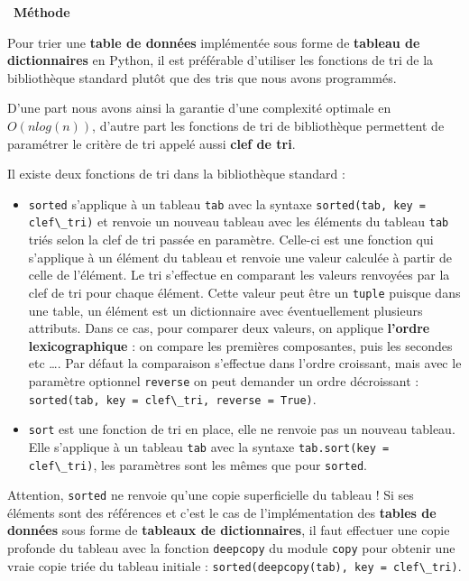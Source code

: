 \documentclass[
  11pt,
]{article}
\newcommand{\passthrough}[1]{#1}
\newcounter{prog}
\newenvironment{methode}[1]
{\par \medskip    \noindent  
 \begin {bclogo}[arrondi =0.1,logo=\bcoutil, marge=4,noborder = true] {~\textbf{Méthode}   {\itshape #1} }  \par}
{
\end{bclogo}
 \par \bigskip }
\begin{document}
\begin{methode}{}

Pour trier une \textbf{table de données} implémentée sous forme de
\textbf{tableau de dictionnaires} en Python, il est préférable
d'utiliser les fonctions de tri de la bibliothèque standard plutôt que
des tris que nous avons programmés.

D'une part nous avons ainsi la garantie d'une complexité optimale en
\(O(nlog(n))\), d'autre part les fonctions de tri de bibliothèque
permettent de paramétrer le critère de tri appelé aussi \textbf{clef de
tri}.

Il existe deux fonctions de tri dans la bibliothèque standard :

\begin{itemize}
\item
  \passthrough{\lstinline!sorted!} s'applique à un tableau
  \passthrough{\lstinline!tab!} avec la syntaxe
  \passthrough{\lstinline!sorted(tab, key = clef\_tri)!} et renvoie un
  nouveau tableau avec les éléments du tableau
  \passthrough{\lstinline!tab!} triés selon la clef de tri passée en
  paramètre. Celle-ci est une fonction qui s'applique à un élément du
  tableau et renvoie une valeur calculée à partir de celle de l'élément.
  Le tri s'effectue en comparant les valeurs renvoyées par la clef de
  tri pour chaque élément. Cette valeur peut être un
  \passthrough{\lstinline!tuple!} puisque dans une table, un élément est
  un dictionnaire avec éventuellement plusieurs attributs. Dans ce cas,
  pour comparer deux valeurs, on applique \textbf{l'ordre
  lexicographique} : on compare les premières composantes, puis les
  secondes etc \ldots. Par défaut la comparaison s'effectue dans l'ordre
  croissant, mais avec le paramètre optionnel
  \passthrough{\lstinline!reverse!} on peut demander un ordre
  décroissant :
  \passthrough{\lstinline!sorted(tab, key = clef\_tri, reverse = True)!}.
\item
  \passthrough{\lstinline!sort!} est une fonction de tri en place, elle
  ne renvoie pas un nouveau tableau. Elle s'applique à un tableau
  \passthrough{\lstinline!tab!} avec la syntaxe
  \passthrough{\lstinline!tab.sort(key = clef\_tri)!}, les paramètres
  sont les mêmes que pour \passthrough{\lstinline!sorted!}.
\end{itemize}

Attention, \passthrough{\lstinline!sorted!} ne renvoie qu'une copie
superficielle du tableau ! Si ses éléments sont des références et c'est
le cas de l'implémentation des \textbf{tables de données} sous forme de
\textbf{tableaux de dictionnaires}, il faut effectuer une copie profonde
du tableau avec la fonction \passthrough{\lstinline!deepcopy!} du module
\passthrough{\lstinline!copy!} pour obtenir une vraie copie triée du
tableau initiale :
\passthrough{\lstinline!sorted(deepcopy(tab), key = clef\_tri)!}.


\end{methode}
\end{document}
